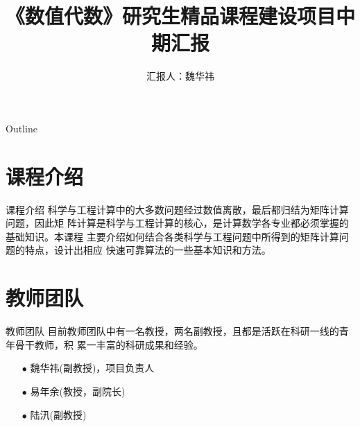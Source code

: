 \documentclass{beamer}
\title{《数值代数》研究生精品课程建设项目中期汇报}
\author{汇报人：魏华祎}
\numberwithin{subsection}{section}
\begin{document}
\begin{frame}
  \titlepage
\end{frame}

\begin{frame}{Outline}
  \tableofcontents
\end{frame}

\section{课程介绍}
\begin{frame}{课程介绍}
    科学与工程计算中的大多数问题经过数值离散，最后都归结为矩阵计算问题，因此矩
    阵计算是科学与工程计算的核心，是计算数学各专业都必须掌握的基础知识。本课程
    主要介绍如何结合各类科学与工程问题中所得到的矩阵计算问题的特点，设计出相应
    快速可靠算法的一些基本知识和方法。
\end{frame}

\section{教师团队}
\begin{frame}{教师团队}
    目前教师团队中有一名教授，两名副教授，且都是活跃在科研一线的青年骨干教师，积
    累一丰富的科研成果和经验。
    \begin{itemize}
        \item[$\bullet$] 魏华祎(副教授)，项目负责人
        \item[$\bullet$] 易年余(教授，副院长)
        \item[$\bullet$] 陆汛(副教授)
    \end{itemize}
\end{frame}
\end{document}

